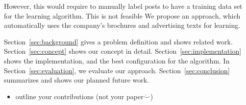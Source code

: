 However, this would require to manually label posts to have a training data set for the learning algorithm.
This is not feasible
We propose an approach, which automatically uses the company's brochures and advertising texts for learning.

Section~\ref{sec:background} gives a problem definition and shows related work.
Section~\ref{sec:concept} shows our concept in detail.
Section~\ref{sec:implementation} shows the implementation, and the best configuration for the algorithm.
In Section~\ref{sec:evaluation}, we evaluate our approach.
Section~\ref{sec:conclusion} summarizes and shows our planned future work.

\begin{itemize}
	\item outline your contributions (not your paper$\ddot\smile$)
\end{itemize}
